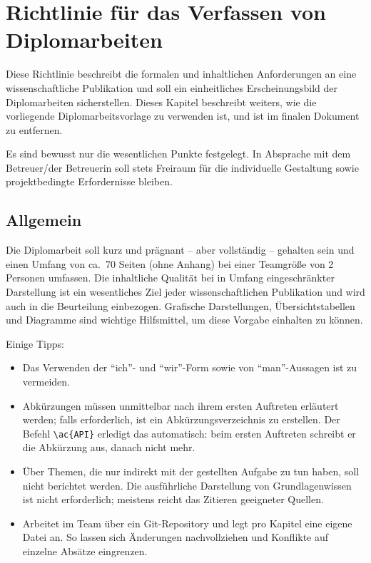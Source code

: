 \chapter{Richtlinie für das Verfassen von Diplomarbeiten}

Diese Richtlinie beschreibt die formalen und inhaltlichen Anforderungen an
eine wissenschaftliche Publikation und soll ein einheitliches
Erscheinungsbild der Diplomarbeiten sicherstellen. Dieses Kapitel beschreibt
weiters, wie die vorliegende Diplomarbeitsvorlage zu verwenden ist, und ist
im finalen Dokument zu entfernen.

Es sind bewusst nur die wesentlichen Punkte festgelegt. In Absprache mit dem
Betreuer/der Betreuerin soll stets Freiraum für die individuelle Gestaltung
sowie projektbedingte Erfordernisse bleiben.

\section{Allgemein}

Die Diplomarbeit soll kurz und prägnant -- aber vollständig -- gehalten sein
und einen Umfang von ca.\ 70 Seiten (ohne Anhang) bei einer Teamgröße von
2 Personen umfassen. Die inhaltliche Qualität bei in Umfang eingeschränkter
Darstellung ist ein wesentliches Ziel jeder wissenschaftlichen Publikation
und wird auch in die Beurteilung einbezogen. Grafische Darstellungen,
Übersichtstabellen und Diagramme sind wichtige Hilfsmittel, um diese Vorgabe
einhalten zu können.

Einige Tipps:

\begin{itemize}
  \item Das Verwenden der \enquote{ich}- und \enquote{wir}-Form sowie von
        \enquote{man}-Aussagen ist zu vermeiden.
  \item Abkürzungen müssen unmittelbar nach ihrem ersten Auftreten erläutert
        werden; falls erforderlich, ist ein Abkürzungsverzeichnis zu
        erstellen. Der Befehl \lstinline|\ac{API}| erledigt das automatisch:
        beim ersten Auftreten schreibt er die Abkürzung aus, danach nicht
        mehr.
  \item Über Themen, die nur indirekt mit der gestellten Aufgabe zu tun
        haben, soll nicht berichtet werden. Die ausführliche Darstellung von
        Grundlagenwissen ist nicht erforderlich; meistens reicht das Zitieren
        geeigneter Quellen.
  \item Arbeitet im Team über ein Git-Repository und legt pro Kapitel eine
        eigene Datei an. So lassen sich Änderungen nachvollziehen und
        Konflikte auf einzelne Absätze eingrenzen.
\end{itemize}

